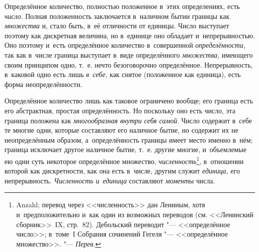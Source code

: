 Определённое количество, полностью положенное в~этих определениях, есть
{\em число}. Полная положенность заключается в~наличном бытии границы как
{\em множества} и, стало быть, в~её отличности от единицы. Число выступает
поэтому как дискретная величина, но в~единице оно обладает и~непрерывностью. Оно
поэтому и~есть определённое количество в~совершенной
{\em определённости,} так как в~числе граница выступает в~виде определённого
{\em множества,} имеющего своим принципом одно, т.~е. нечто безоговорочно
определённое. Непрерывность, в~каковой одно есть лишь {\em в~себе,} как снятое
(положенное как единица), есть форма неопределённости.

Определённое количество лишь как таковое ограничено вообще; его граница есть
его абстрактная, простая определённость. Но поскольку оно есть число, эта
граница положена как {\em многообразная внутри себя самой}. Число содержит в~себе те
многие одни, которые составляют его наличное бытие, но содержит их не
неопределённым образом, а~определённость границы имеет место именно в~нём;
граница исключает другое наличное бытие, т.~е. другие многие, и~объемлемые ею
одни суть некоторое определённое множество, {\em численность}\footnote{Anzahl;
перевод через <<численность>> дан Лениным, хотя и~предположительно и~как один
из возможных переводов (см. <<Ленинский сборник>>~IX, стр.~82). Дебольский
переводит "--- <<определённое число>>; в~томе~I Собрания сочинений Гегеля "---
<<определённое множество>>. "--- {\em Перев}.}, в~отношении которой как
дискретности, как она есть в~числе, другим служит {\em единица,} его
непрерывность. {\em Численность и~единица} составляют {\em моменты} числа.

